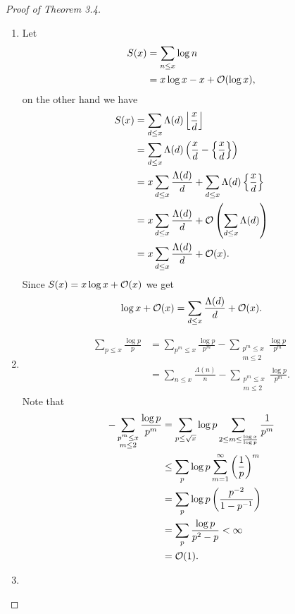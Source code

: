 \documentclass[twoside, openright, fontsize=10pt, headings=big]{scrbook}
\begin{document}
\begin{proof}[Proof of Theorem 3.4]
    \begin{enumerate}
        \item[(1)] Let 
        \begin{align*}
            S(x)&=\sum_{n\leq x}\log n\\
            &=x\log x-x+\mathcal{O}(\log x),
        \end{align*}
        on the other hand we have
        \begin{align*}
            S(x)&=\sum_{d\leq x}\Lambda(d)\left\lfloor \frac{x}{d} \right\rfloor\\
            &=\sum_{d\leq x}\Lambda(d)\left(\frac{x}{d}-\left\{ \frac{x}{d} \right\}\right)\\
            &=x\sum_{d\leq x}\frac{\Lambda(d)}{d}+\sum_{d\leq x}\Lambda(d)\left\{ \frac{x}{d} \right\}\\
            &=x\sum_{d\leq x}\frac{\Lambda(d)}{d}+\mathcal{O}\left(\sum_{d\leq x}\Lambda(d)\right)\\
            &=x\sum_{d\leq x}\frac{\Lambda(d)}{d}+\mathcal{O}(x).
        \end{align*}
        Since $S(x)=x\log x+\mathcal{O}(x)$ we get
        \[
            \log x+\mathcal{O}(x)=\sum_{d\leq x}\frac{\Lambda(d)}{d}+\mathcal{O}(x).
        \]
        \item[(2)]
        \begin{align*}
            \sum_{p\leq x}\frac{\log p}{p}&=\sum_{p^m\leq x}\frac{\log p}{p^m}-\sum_{\substack{p^m\leq x\\ m\leq2}}\frac{\log p}{p^m}\\
            &=\sum_{n\leq x}\frac{\Lambda(n)}{n}-\sum_{\substack{p^m\leq x\\ m\leq2}}\frac{\log p}{p^m}.
        \end{align*}
        Note that
        \begin{align*}
            -\sum_{\substack{p^m\leq x\\ m\leq2}}\frac{\log p}{p^m}&=\sum_{p\leq\sqrt{x}}\log p\sum_{2\leq m\leq\frac{\log x}{\log p}}\frac{1}{p^m}\\
            &\leq\sum_{p}\log p\sum_{m=1}^{\infty}\left(\frac{1}{p}\right)^m\\
            &=\sum_{p}\log p\left(\frac{p^{-2}}{1-p^{-1}}\right)\\
            &=\sum_{p}\frac{\log p}{p^2-p}<\infty\\
            &=\mathcal{O}(1).
        \end{align*}
        \item[(3)] 

\end{enumerate}
\end{proof}
\end{document}
